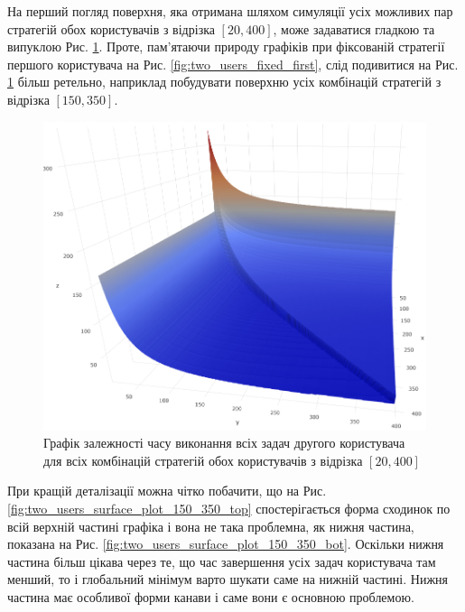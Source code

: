 На перший погляд поверхня, яка отримана шляхом симуляції усіх можливих пар стратегій обох користувачів з відрізка $[20, 400]$, може задаватися гладкою та випуклою Рис. \ref{fig:two_users_surface_plot_20_400}. Проте, пам'ятаючи природу графіків при фіксованій стратегії першого користувача на Рис. \ref{fig:two_users_fixed_first}, слід подивитися на Рис. \ref{fig:two_users_surface_plot_20_400} більш ретельно, наприклад побудувати поверхню усіх комбінацій стратегій з відрізка $[150, 350]$.

\begin{figure}[H]
	\centering
	\includegraphics[width=\textwidth]{practice/img/two_users_surface_plot_20_400}
	\caption{Графік залежності часу виконання всіх задач другого користувача для всіх комбінацій стратегій обох користувачів з відрізка $[20, 400]$}
	\label{fig:two_users_surface_plot_20_400}
\end{figure}

При кращій деталізації можна чітко побачити, що на Рис. \ref{fig:two_users_surface_plot_150_350_top} спостерігається форма сходинок по всій верхній частині графіка і вона не така проблемна, як нижня частина, показана на Рис. \ref{fig:two_users_surface_plot_150_350_bot}. Оскільки нижня частина більш цікава через те, що час завершення усіх задач користувача там менший, то і глобальний мінімум варто шукати саме на нижній частині. Нижня частина має особливої форми канави і саме вони є основною проблемою.

